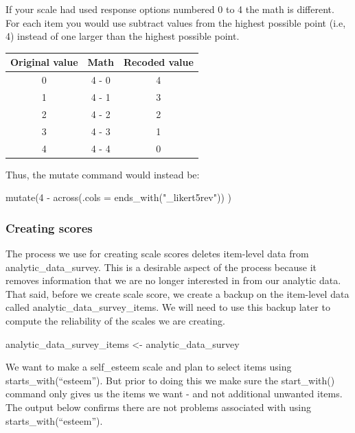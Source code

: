 \documentclass[
]{krantz}
\makeatletter
\newenvironment{Shaded}{\begin{snugshade}}{\end{snugshade}}
\newcommand{\NormalTok}[1]{#1}
\newcommand{\OtherTok}[1]{\textcolor[rgb]{0.37,0.37,0.37}{#1}}
\newenvironment{kframe}{%
\medskip{}
\setlength{\fboxsep}{.8em}
 \def\at@end@of@kframe{}%
 \ifinner\ifhmode%
  \def\at@end@of@kframe{\end{minipage}}%
  \begin{minipage}{\columnwidth}%
 \fi\fi%
 \def\FrameCommand##1{\hskip\@totalleftmargin \hskip-\fboxsep
 \colorbox{shadecolor}{##1}\hskip-\fboxsep
     \hskip-\linewidth \hskip-\@totalleftmargin \hskip\columnwidth}%
 \MakeFramed {\advance\hsize-\width
   \@totalleftmargin\z@ \linewidth\hsize
   \@setminipage}}%
 {\par\unskip\endMakeFramed%
 \at@end@of@kframe}
\newenvironment{rmdblock}[1]
  {
  \begin{itemize}
  \renewcommand{\labelitemi}{
    \raisebox{-.7\height}[0pt][0pt]{
      {\setkeys{Gin}{width=3em,keepaspectratio}\texttt{[image: images/\#1]}}
    }
  }
  \setlength{\fboxsep}{1em}
  \begin{kframe}
  \item
  }
  {
  \end{kframe}
  \end{itemize}
  }
\newenvironment{rmdcaution}
  {\begin{rmdblock}{caution}}
  {\end{rmdblock}}
\renewenvironment{Shaded}{\begin{kframe}}{\end{kframe}}
\makeatother
\begin{document}
\begin{rmdcaution}
If your scale had used response options numbered 0 to 4 the math is different.
For each item you would use subtract values from the highest possible point (i.e, 4) instead of one larger than the highest possible point.

\begin{longtable}[]{@{}ccc@{}}
\toprule
Original value & Math & Recoded value \\
\midrule
\endhead
0 & 4 - 0 & 4 \\
1 & 4 - 1 & 3 \\
2 & 4 - 2 & 2 \\
3 & 4 - 3 & 1 \\
4 & 4 - 4 & 0 \\
\bottomrule
\end{longtable}

Thus, the mutate command would instead be:

mutate(4 - across(.cols = ends\_with("\_likert5rev")) )
\end{rmdcaution}

\hypertarget{creating-scores}{%
\subsubsection{Creating scores}\label{creating-scores}}

The process we use for creating scale scores deletes item-level data from analytic\_data\_survey. This is a desirable aspect of the process because it removes information that we are no longer interested in from our analytic data. That said, before we create scale score, we create a backup on the item-level data called analytic\_data\_survey\_items. We will need to use this backup later to compute the reliability of the scales we are creating.

\begin{Shaded}
\begin{Highlighting}[]
\NormalTok{analytic\_data\_survey\_items }\OtherTok{\textless{}{-}}\NormalTok{ analytic\_data\_survey}
\end{Highlighting}
\end{Shaded}

We want to make a self\_esteem scale and plan to select items using starts\_with(``esteem''). But prior to doing this we make sure the start\_with() command only gives us the items we want - and not additional unwanted items. The output below confirms there are not problems associated with using starts\_with(``esteem'').
\end{document}
